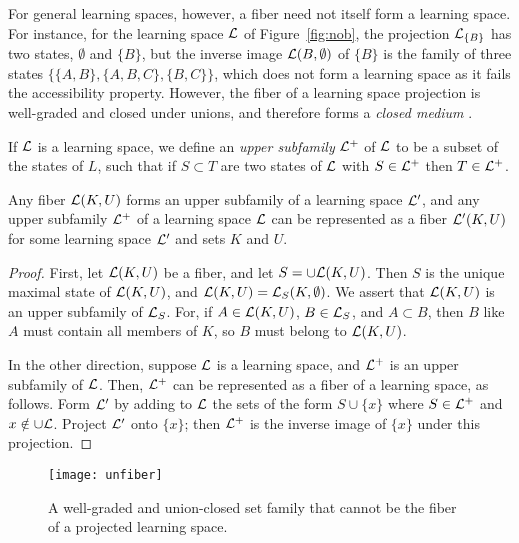 \documentclass[11pt]{llncs}
\begin{document}
{For general learning spaces, however, a fiber need not itself form a learning space. For instance, for the learning space $\cal L$ of Figure~\ref{fig:nob}, the projection ${\cal L}_{\{B\}}$ has two states, $\emptyset$ and $\{B\}$, but the inverse image ${\cal L}({B},\emptyset)$ of $\{B\}$ is the family of three states $\{\{A,B\},\{A,B,C\},\{B,C\}\}$, which does not form a learning space as it fails the accessibility property. However, the fiber of a learning space projection is well-graded and closed under unions, and therefore forms a \emph{closed medium} \citep{falma02}.

If $\cal L$ is a learning space, we define an \emph{upper subfamily} ${\cal L}^+$ of $\cal L$ to be a subset of the states of $L$, such that if $S\subset T$ are two states of $\cal L$ with $S\in{\cal L}^+$ then $T\in{\cal L}^+$.

\begin{theorem}
Any fiber ${\cal L}(K,U)$ forms an upper subfamily of a learning space ${\cal L}'$,
and any upper subfamily ${\cal L}^+$ of a learning space $\cal L$ can be represented as a fiber ${\cal L}'(K,U)$ for some learning space ${\cal L}'$ and sets $K$ and $U$.
\end{theorem}

\begin{proof}
First, let ${\cal L}(K,U)$ be a fiber, and let $S=\cup{\cal L}(K,U)$. Then $S$ is the unique maximal
state of ${\cal L}(K,U)$, and ${\cal L}(K,U)={\cal L}_S(K,\emptyset)$. We assert that ${\cal L}(K,U)$ is an upper subfamily of ${\cal L}_S$. For, if $A\in {\cal L}(K,U)$, $B\in{\cal L}_S$, and $A\subset B$,
then $B$ like $A$ must contain all members of $K$, so $B$ must belong to ${\cal L}(K,U)$.

In the other direction, suppose $\cal L$ is a learning space, and ${\cal L}^+$ is an upper subfamily of $\cal L$. Then, ${\cal L}^+$ can be represented as a fiber of a learning space, as follows. Form ${\cal L}'$ by adding to ${\cal L}$ the sets of the form $S\cup\{x\}$ where $S\in{\cal L}^+$ and $x\notin\cup\cal L$.
Project ${\cal L}'$ onto $\{x\}$; then ${\cal L}^+$ is the inverse image of $\{x\}$ under this projection.
\end{proof}

\begin{figure}[t]
\centering\texttt{[image: unfiber]}
\caption{A well-graded and union-closed set family that cannot be the fiber of a projected learning space.}
\label{fig:unfiber}
\end{figure}

}
\end{document}
